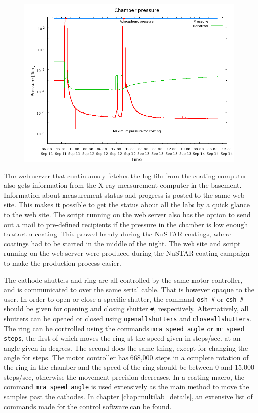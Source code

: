 \begin{figure}[htbp]
  \centering
    \includegraphics[width=0.8\linewidth]{figures/chamber/pressure.png}
  \caption{\footnotesize }
  \label{fig:chamber_pressure}
\end{figure}

The web server that continuously fetches the log file from the coating computer also gets information from the X-ray measurement computer in the basement. Information about measurement status and progress is posted to the same web site. This makes it possible to get the status about all the labs by a quick glance to the web site. The script running on the web server also has the option to send out a mail to pre-defined recipients if the pressure in the chamber is low enough to start a coating. This proved handy during the NuSTAR coatings, where coatings had to be started in the middle of the night. The web site and script running on the web server were produced during the NuSTAR coating campaign to make the production process easier.

The cathode shutters and ring are all controlled by the same motor controller, and is communicated to over the same serial cable. That is however opaque to the user. In order to open or close a specific shutter, the command \verb'osh #' or \verb'csh #' should be given for opening and closing shutter \verb'#', respectively. Alternatively, all shutters can be opened or closed using \verb'openallshutters' and \verb'closeallshutters'. The ring can be controlled using the commands \verb'mra speed angle' or \verb'mr speed steps', the first of which moves the ring at the speed given in steps/sec. at an angle given in degrees. The second does the same thing, except for changing the angle for steps. The motor controller has 668,000 steps in a complete rotation of the ring in the chamber and the speed of the ring should be between 0 and 15,000 steps/sec, otherwise the movement precision decreases. In a coating macro, the command \verb'mra speed angle' is used extensively as the main method to move the samples past the cathodes. In chapter \ref{chap:multilab_details}, an extensive list of commands made for the control software can be found.

